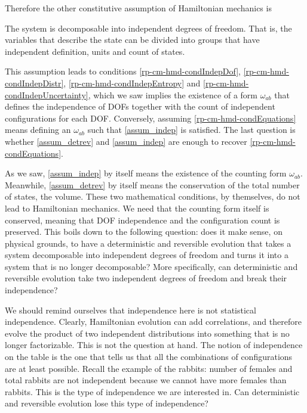 Therefore the other constitutive assumption of Hamiltonian mechanics is
\renewcommand{\theassump}{IND}
\begin{assump}\label{assum_indep}
	The system is decomposable into independent degrees of freedom. That is, the variables that describe the state can be divided into groups that have independent definition, units and count of states.
\end{assump}
\renewcommand{\theassump}{\Roman{assump}}
This assumption leads to conditions \ref{rp-cm-hmd-condIndepDof}, \ref{rp-cm-hmd-condIndepDistr}, \ref{rp-cm-hmd-condIndepEntropy} and
\ref{rp-cm-hmd-condIndepUncertainty}, which we saw implies the existence of a form $\omega_{ab}$ that defines the independence of DOFs together with the count of independent configurations for each DOF. Conversely, assuming \ref{rp-cm-hmd-condEquations} means defining an $\omega_{ab}$ such that \ref{assum_indep} is satisfied. The last question is whether \ref{assum_detrev} and \ref{assum_indep} are enough to recover \ref{rp-cm-hmd-condEquations}.

As we saw, \ref{assum_indep} by itself means the existence of the counting form $\omega_{ab}$. Meanwhile, \ref{assum_detrev} by itself means the conservation of the total number of states, the volume. These two mathematical conditions, by themselves, do not lead to Hamiltonian mechanics. We need that the counting form itself is conserved, meaning that DOF independence and the configuration count is preserved. This boils down to the following question: does it make sense, on physical grounds, to have a deterministic and reversible evolution that takes a system decomposable into independent degrees of freedom and turns it into a system that is no longer decomposable? More specifically, can deterministic and reversible evolution take two independent degrees of freedom and break their independence?

We should remind ourselves that independence here is not statistical independence. Clearly, Hamiltonian evolution can add correlations, and therefore evolve the product of two independent distributions into something that is no longer factorizable. This is not the question at hand. The notion of independence on the table is the one that tells us that all the combinations of configurations are at least possible. Recall the example of the rabbits: number of females and total rabbits are not independent because we cannot have more females than rabbits. This is the type of independence we are interested in. Can deterministic and reversible evolution lose this type of independence?

